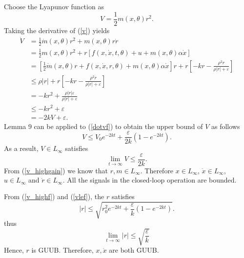 \documentclass[12pt,a4paper]{article}
\begin{document}
\indent Choose the Lyapunov function as
\begin{equation}
V=\frac12m(x,\theta)r^2.
\label{v_highf}
\end{equation}
Taking the derivative of (\ref{v}) yields
\begin{equation}
\begin{aligned}
\dot V&=\frac12\dot m(x,\theta)r^2+m(x,\theta)r\dot r\\
&=\frac12 m(x,\theta)r^2+r\left[f(x,\dot x,t,\theta)+u+m(x,\theta)\alpha\dot x\right]\\
&=\left[\frac12\dot m(x,\theta)r+f(x,\dot x,r,\theta)+m(x,\theta)\alpha\dot x\right]r+r\left[-kr-\frac{\rho^2r}{\rho|r|+\varepsilon}\right]\\
&\le \rho|r|+r\left[-kr-\frac{\rho^2r}{\rho|r|+\varepsilon}\right]\\
&= -kr^2+\frac{\rho|r|\varepsilon}{\rho|r|+\varepsilon}\\
&\le -kr^2+\varepsilon\\
&=-2kV+\varepsilon.
\end{aligned}
\label{dotvf}
\end{equation}
Lemma 9 can be applied to (\ref{dotvf}) to obtain the upper bound of $V$ as follows
\begin{equation}
V\le V_0e^{-2kt}+\frac{\varepsilon}{2k}\left(1-e^{-2kt}\right).
\label{vlef}
\end{equation}
As a result, $V\in L_\infty$ satisfies
\begin{equation}
\lim_{t\to\infty}V\le \frac{\varepsilon}{2k}.
\end{equation}
From (\ref{v_highgain}) we know that $r,m\in L_\infty$. Therefore $x\in L_\infty$, $\dot x\in L_\infty$, $u\in L_\infty$ and $\dot r\in L_\infty$. All the signals in the closed-loop operation are bounded.

\indent From (\ref{v_highf}) and (\ref{vlef}), the $r$ satisfies
\begin{equation}
|r|\le \sqrt{r^2_0e^{-2kt}+\frac{\varepsilon}{k}\left(1-e^{-2kt}\right)}.
\label{vlef}
\end{equation}
thus
\begin{equation}
\lim_{t\to\infty}|r|\le\sqrt{\frac{\varepsilon}{k}}
\end{equation}
Hence, $r$ is GUUB. Therefore, $x,\dot x$ are both GUUB.
\end{document}
